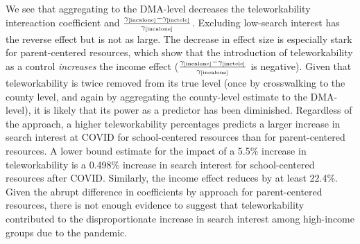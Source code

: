     We see that aggregating to the DMA-level decreases the teleworkability intereaction coefficient and $\frac{\gamma_\refeq{incalone}-\gamma_\refeq{inctele}}{\gamma_\refeq{incalone}}$.
Excluding low-search interest has the reverse effect but is not as large.
The decrease in effect size is especially stark for parent-centered resources, which show that the introduction of teleworkability as a control \textit{increases} the income effect ($\frac{\gamma_\refeq{incalone}-\gamma_\refeq{inctele}}{\gamma_\refeq{incalone}}$ is negative).
Given that teleworkability is twice removed from its true level (once by crosswalking to the county level, and again by aggregating the county-level estimate to the DMA-level), it is likely that its power as a predictor has been diminished.
Regardless of the approach, a higher teleworkability percentages predicts a larger increase in search interest at COVID for school-centered resources than for parent-centered resources.
A lower bound estimate for the impact of a 5.5\% increase in teleworkability is a 0.498\% increase in search interest for school-centered resources after COVID.
Similarly, the income effect reduces by at least 22.4\%.
Given the abrupt difference in coefficients by approach for parent-centered resources, there is not enough evidence to suggest that teleworkability contributed to the disproportionate increase in search interest among high-income groups due to the pandemic.

